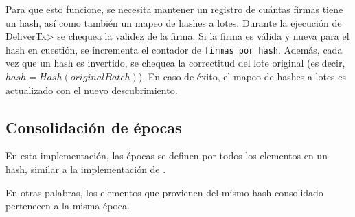Para que esto funcione, se necesita mantener un registro de cuántas firmas tiene un hash,
así como también un mapeo de hashes a lotes.
%
Durante la ejecución de \<DeliverTx> se chequea la validez de la firma.
%
Si la firma es válida y nueva para el hash en cuestión, se incrementa el contador de
\texttt{firmas por hash}.
%
Además, cada vez que un hash es invertido, se chequea la correctitud del lote original
(es decir, $hash = Hash(originalBatch)$). En caso de éxito, el mapeo de hashes a lotes
es actualizado con el nuevo descubrimiento.

%


%




\subsection{Consolidación de épocas}\label{subsubsec:consolidation}

En esta implementación, las épocas se definen por todos los elementos en un hash, similar
a la implementación de \compresschain.

%
En otras palabras, los elementos que provienen del mismo hash consolidado pertenecen a la
misma época.

%
%

